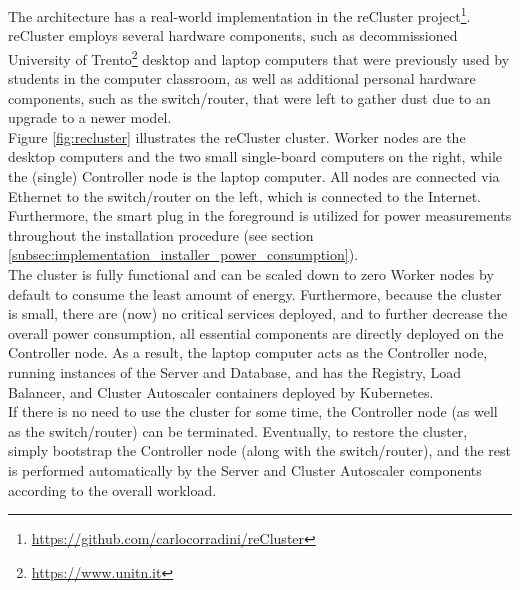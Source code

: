 The architecture has a real-world implementation in the reCluster project\footnote{\url{https://github.com/carlocorradini/reCluster}}.
\\ %
reCluster employs several hardware components, such as decommissioned University
of Trento\footnote{\url{https://www.unitn.it}} desktop and laptop computers that
were previously used by students in the computer classroom, as well as additional
personal hardware components, such as the switch/router, that were left to gather
dust due to an upgrade to a newer model. \\ %
Figure \ref{fig:recluster} illustrates the reCluster cluster. Worker nodes are
the desktop computers and the two small single-board computers on the right, while
the (single) Controller node is the laptop computer. All nodes are connected via
Ethernet to the switch/router on the left, which is connected to the Internet.
Furthermore, the smart plug in the foreground is utilized for power measurements
throughout the installation procedure (see section
\ref{subsec:implementation_installer_power_consumption}). \\ %
The cluster is fully functional and can be scaled down to zero Worker nodes by default
to consume the least amount of energy. Furthermore, because the cluster is small,
there are (now) no critical services deployed, and to further decrease the overall
power consumption, all essential components are directly deployed on the
Controller node. As a result, the laptop computer acts as the Controller node, running
instances of the Server and Database, and has the Registry, Load Balancer, and
Cluster Autoscaler containers deployed by Kubernetes. \\ %
If there is no need to use the cluster for some time, the Controller node (as
well as the switch/router) can be terminated. Eventually, to restore the cluster,
simply bootstrap the Controller node (along with the switch/router), and the rest
is performed automatically by the Server and Cluster Autoscaler components according
to the overall workload.

